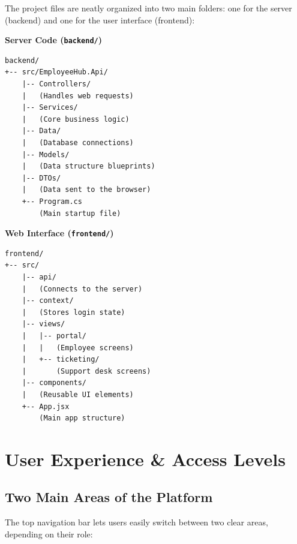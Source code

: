 \documentclass[a4paper,11pt]{article}
\begin{document}
The project files are neatly organized into two main folders: one for the server (backend) and one for the user interface (frontend):

\begin{center}
\begin{tcolorbox}[colback=white,colframe=bordergray,arc=2mm,boxrule=0.8pt,width=0.98\textwidth]
\begin{minipage}[t]{0.48\textwidth}
\small\bfseries\textcolor{brandblue}{Server Code (\texttt{backend/})}
\begin{verbatim}
backend/
+-- src/EmployeeHub.Api/
    |-- Controllers/
    |   (Handles web requests)
    |-- Services/
    |   (Core business logic)
    |-- Data/
    |   (Database connections)
    |-- Models/
    |   (Data structure blueprints)
    |-- DTOs/
    |   (Data sent to the browser)
    +-- Program.cs
        (Main startup file)
\end{verbatim}
\end{minipage}
\hfill
\begin{minipage}[t]{0.48\textwidth}
\small\bfseries\textcolor{brandblue}{Web Interface (\texttt{frontend/})}
\begin{verbatim}
frontend/
+-- src/
    |-- api/
    |   (Connects to the server)
    |-- context/
    |   (Stores login state)
    |-- views/
    |   |-- portal/
    |   |   (Employee screens)
    |   +-- ticketing/
    |       (Support desk screens)
    |-- components/
    |   (Reusable UI elements)
    +-- App.jsx
        (Main app structure)
\end{verbatim}
\end{minipage}
\end{tcolorbox}
\end{center}

\section{User Experience \& Access Levels}

\subsection{Two Main Areas of the Platform}
The top navigation bar lets users easily switch between two clear areas, depending on their role:
\end{document}

